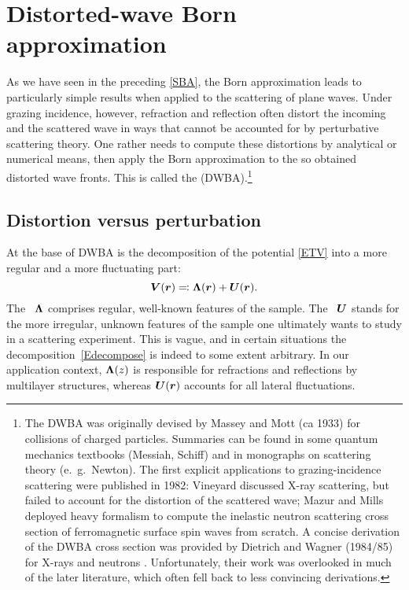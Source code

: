 \section{Distorted-wave Born approximation}\label{SDWBA}

As we have seen in the preceding \cref{SBA},
the Born approximation leads to particularly simple results when applied
to the scattering of plane waves.
Under grazing incidence, however,
refraction
%
and reflection
%
often distort the incoming and the scattered wave in ways
that cannot be accounted for by perturbative scattering theory.
One rather needs to compute these distortions by analytical or numerical means,
then apply the Born approximation to the so obtained distorted wave fronts.
This is called the
%
 (DWBA).\footnote
{The DWBA was originally devised by Massey and Mott (ca 1933)
for collisions of charged particles.
Summaries can be found in some quantum mechanics textbooks (Messiah, Schiff)
and in monographs on scattering theory (e.~g.\ Newton).
The first explicit applications to grazing-incidence scattering
were published in 1982:
Vineyard \cite{Vin82} discussed X-ray scattering,
but failed to account for the distortion of the scattered wave;
Mazur and Mills \cite{MaMi82} deployed heavy formalism
to compute the inelastic neutron scattering cross section
of ferromagnetic surface spin waves from scratch.
A concise derivation of the DWBA cross section
was provided by Dietrich and Wagner (1984/85)
for X-rays \cite{DiWa84} and neutrons \cite{DiWa85}.
Unfortunately, their work was overlooked in much of the later literature,
which often fell back to less convincing derivations.}

\subsection{Distortion versus perturbation}\label{Sdecompose}

At the base of DWBA is the decomposition of the potential \cref{ETV}
into a more regular and a more fluctuating part:
\begin{equation}\label{Edecompose}
  \TV(\r) \eqqcolon \TL(\r) + \TU(\r).
\end{equation}
The ~$\bm{\Lambda}$
%
%
comprises regular, well-known features of the sample.
The ~$\bm{U}$
%
%
%
stands for the more irregular, unknown features of the sample
one ultimately wants to study in a scattering experiment.
This is vague,
and in certain situations the decomposition~\cref{Edecompose} is indeed
to some extent arbitrary.
In our application context,
$\bm{\Lambda}(z)$ is responsible for refractions and reflections
by multilayer structures,
whereas $\bm{U}(\bm{r})$ accounts for all lateral fluctuations.

